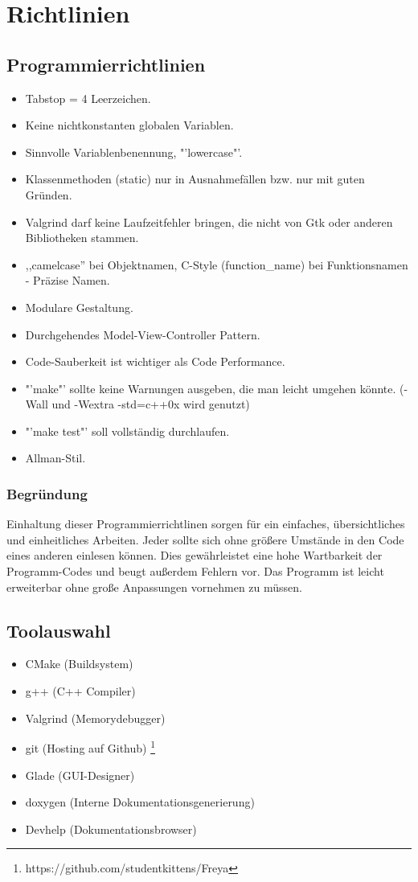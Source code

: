 \chapter{Richtlinien}
\section{Programmierrichtlinien}
\renewcommand{\labelitemi}{•}
\begin{itemize}
\item Tabstop = 4 Leerzeichen.
\item Keine nichtkonstanten globalen Variablen.
\item Sinnvolle Variablenbenennung, "'lowercase"'.
\item Klassenmethoden (static) nur in Ausnahmefällen bzw. nur mit guten Gründen.
\item Valgrind darf keine Laufzeitfehler bringen, die nicht von Gtk oder anderen Bibliotheken stammen.
\item ,,camelcase'' bei Objektnamen, C-Style (function\_name) bei Funktionsnamen - Präzise Namen.
\item Modulare Gestaltung.
\item Durchgehendes Model-View-Controller Pattern.
\item Code-Sauberkeit ist wichtiger als Code Performance.
\item "'make"' sollte keine Warnungen ausgeben, die man leicht umgehen könnte. (-Wall und -Wextra -std=c++0x wird genutzt)
\item "'make test"' soll vollständig durchlaufen.
\item Allman-Stil.
\end{itemize}
\subsection{Begründung}
Einhaltung dieser Programmierrichtlinen sorgen für ein einfaches, übersichtliches und einheitliches Arbeiten.
Jeder sollte sich ohne größere Umstände in den Code eines anderen einlesen können. Dies gewährleistet eine
hohe Wartbarkeit der Programm-Codes und beugt außerdem Fehlern vor. Das Programm ist leicht
erweiterbar ohne große Anpassungen vornehmen zu müssen.
\section{Toolauswahl}
\begin{itemize}
\item CMake (Buildsystem)
\item g++ (C++ Compiler)
\item Valgrind (Memorydebugger)
\item git (Hosting auf Github) \footnote{https://github.com/studentkittens/Freya}
\item Glade (GUI-Designer)
\item doxygen  (Interne Dokumentationsgenerierung)
\item Devhelp (Dokumentationsbrowser)
\end{itemize}
